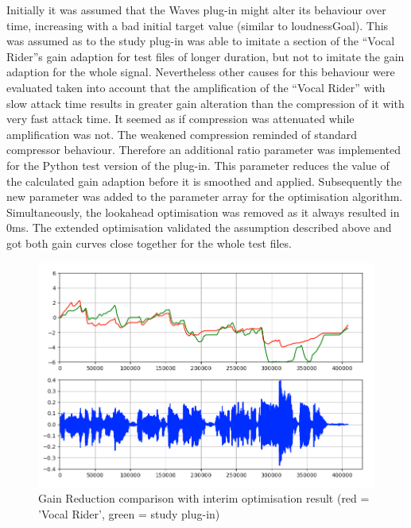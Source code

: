 Initially it was assumed that the Waves plug-in might alter its behaviour over time, increasing with a bad initial target value (similar to loudnessGoal). This was assumed as to the study plug-in was able to imitate a section of the “Vocal Rider”s gain adaption for test files of longer duration, but not to imitate the gain adaption for the whole signal. Nevertheless other causes for this behaviour were evaluated taken into account that the amplification of the “Vocal Rider” with slow attack time results in greater gain alteration than the compression of it with very fast attack time. It seemed as if compression was attenuated while amplification was not. The weakened compression reminded of standard compressor behaviour. Therefore an additional ratio parameter was implemented for the Python test version of the plug-in. This parameter reduces the value of the calculated gain adaption before it is smoothed and applied. Subsequently the new parameter was added to the parameter array for the optimisation algorithm. Simultaneously, the lookahead optimisation was removed as it always resulted in 0ms. The extended optimisation validated the assumption described above and got both gain curves close together for the whole test files.\\

\begin{figure}[H]
\includegraphics[width=\textwidth]{images/onlyParts}
\caption{Gain Reduction comparison with interim optimisation result (red = 'Vocal Rider', green = study plug-in)}
\end{figure}

